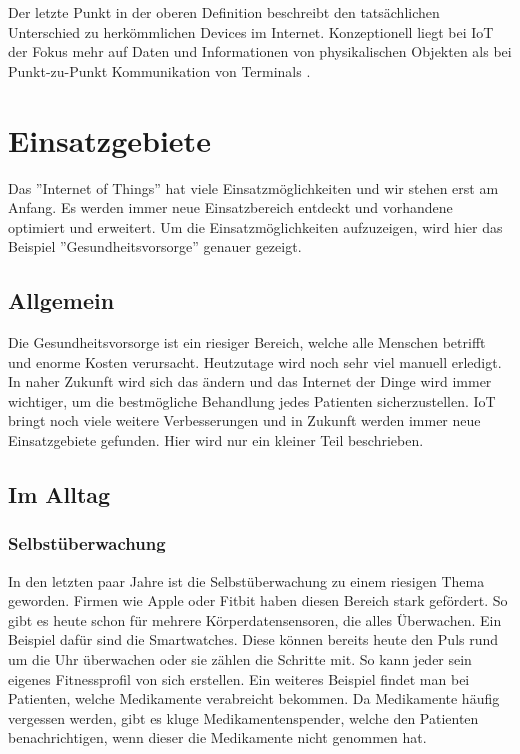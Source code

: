 Der letzte Punkt in der oberen Definition beschreibt den tatsächlichen Unterschied zu herkömmlichen Devices im Internet. Konzeptionell liegt bei IoT der Fokus mehr auf Daten und Informationen von physikalischen Objekten als bei Punkt-zu-Punkt Kommunikation von Terminals \cite{MiorandiSicariPellegriniChlamtac12}.

\newpage

\section{Einsatzgebiete}
Das ''Internet of Things'' hat viele Einsatzmöglichkeiten und wir stehen erst am Anfang. Es werden immer neue Einsatzbereich entdeckt und vorhandene optimiert und erweitert. Um die Einsatzmöglichkeiten aufzuzeigen, wird hier das Beispiel ''Gesundheitsvorsorge'' genauer gezeigt.
\subsection{Allgemein}
Die Gesundheitsvorsorge ist ein riesiger Bereich, welche alle Menschen betrifft und enorme Kosten verursacht. Heutzutage wird noch sehr viel manuell erledigt. In naher Zukunft wird sich das ändern und das Internet der Dinge wird immer wichtiger, um die bestmögliche Behandlung jedes Patienten sicherzustellen. IoT bringt noch viele weitere Verbesserungen und in Zukunft werden immer neue Einsatzgebiete gefunden. Hier wird nur ein kleiner Teil beschrieben. 
\subsection{Im Alltag}
\subsubsection{Selbstüberwachung}
In den letzten paar Jahre ist die Selbstüberwachung zu einem riesigen Thema geworden. Firmen wie Apple oder Fitbit haben diesen Bereich stark gefördert. So gibt es heute schon für mehrere Körperdatensensoren, die alles Überwachen. Ein Beispiel dafür sind die Smartwatches. Diese können bereits heute den Puls rund um die Uhr überwachen oder sie zählen die Schritte mit. So kann jeder sein eigenes Fitnessprofil von sich erstellen.
Ein weiteres Beispiel findet man bei Patienten, welche Medikamente verabreicht bekommen. Da Medikamente häufig vergessen werden, gibt es kluge Medikamentenspender, welche den Patienten benachrichtigen, wenn dieser die Medikamente nicht genommen hat.

